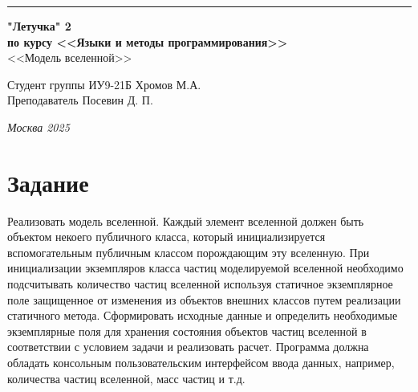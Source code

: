 \documentclass[a4paper, 14pt]{extarticle}
\begin{document}
\begin{titlepage}
\vspace*{-16pt}
\hspace{30pt}\rule{0.866\textwidth}{0.4pt}
  
\vspace{11em}

\begin{center}
\Large {\bf "Летучка" 2} \\ 
\large {\bf по курсу <<Языки и методы программирования>>} \\ 
\large <<Модель вселенной>>
\end{center}\normalsize

\vspace{8em}


\begin{flushright}
  {Студент группы ИУ9-21Б Хромов М.А.\hspace*{15pt} \\
  \vspace{2ex}
  Преподаватель Посевин Д. П.\hspace*{15pt}}
\end{flushright}

\bigskip

\vfill
 

\begin{center}
\textsl{Москва 2025}
\end{center}
\end{titlepage}

\renewcommand{\ttdefault}{pcr}

\setlength{\tabcolsep}{3pt}
\newpage


 

\section{Задание}\label{Sect::task}
\par
Реализовать модель вселенной. Каждый элемент вселенной должен быть объектом некоего публичного класса, который инициализируется вспомогательным публичным классом порождающим эту вселенную. При инициализации экземпляров класса частиц моделируемой вселенной необходимо подсчитывать количество частиц вселенной используя статичное экземплярное поле защищенное от изменения из объектов внешних классов путем реализации статичного метода. Сформировать исходные данные и определить необходимые экземплярные поля для хранения состояния объектов частиц вселенной в соответствии с условием задачи и реализовать расчет.  
	Программа должна обладать консольным пользовательским интерфейсом ввода данных, например, количества частиц вселенной, масс частиц и т.д.
\end{document}
